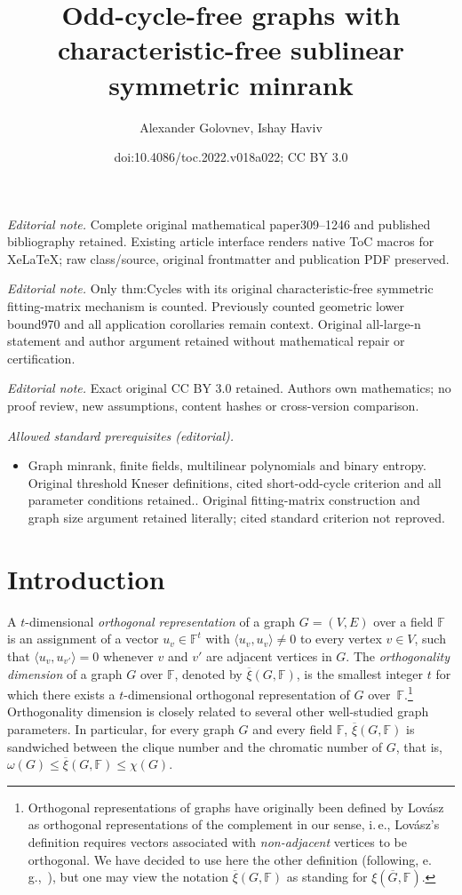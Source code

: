 \documentclass[11pt]{article}
\title{Odd-cycle-free graphs with characteristic-free sublinear symmetric minrank}
\author{Alexander Golovnev, Ishay Haviv}
\date{doi:10.4086/toc.2022.v018a022; CC BY 3.0}
\numberwithin{equation}{section}
\theoremstyle{definition}
\theoremstyle{plain}
\newcommand{\ie}{i.\,e.}
\newcommand{\Fset}{\mathbb{F}}
\newcommand{\od}{\overline{\xi}}
\begin{document}
\maketitle
\noindent\textit{Editorial note.} Complete original mathematical paper309--1246 and published bibliography retained. Existing article interface renders native ToC macros for XeLaTeX; raw class/source, original frontmatter and publication PDF preserved.\par\medskip
\noindent\textit{Editorial note.} Only thm:Cycles with its original characteristic-free symmetric fitting-matrix mechanism is counted. Previously counted geometric lower bound970 and all application corollaries remain context. Original all-large-n statement and author argument retained without mathematical repair or certification.\par\medskip
\noindent\textit{Editorial note.} Exact original CC BY 3.0 retained. Authors own mathematics; no proof review, new assumptions, content hashes or cross-version comparison.\par\medskip
\noindent\textit{Allowed standard prerequisites (editorial).}\begin{itemize}
\item Graph minrank, finite fields, multilinear polynomials and binary entropy. Original threshold Kneser definitions, cited short-odd-cycle criterion and all parameter conditions retained.. Original fitting-matrix construction and graph size argument retained literally; cited standard criterion not reproved.
\end{itemize}\medskip
\section{Introduction}

A $t$-dimensional \emph{orthogonal representation} of a graph $G=(V,E)$ over a field $\Fset$ is an assignment of a vector $u_v \in \Fset^t$ with $\langle u_v,u_v \rangle \neq 0$ to every vertex $v \in V$, such that $\langle u_v, u_{v'} \rangle = 0$ whenever $v$ and $v'$ are adjacent vertices in $G$. The \emph{orthogonality dimension} of a graph $G$ over $\Fset$, denoted by $\od(G, \Fset)$, is the smallest integer $t$ for which there exists a $t$-dimensional orthogonal representation of $G$ over~$\Fset$.\footnote{Orthogonal representations of graphs
%
have originally been defined by Lov\'asz~\cite{Lovasz79}
as orthogonal representations of the complement
in our sense,  %
%
\ie, Lov\'asz's  %
definition requires vectors associated with \emph{non-adjacent} vertices to be orthogonal.
We have decided to use here the other definition (following, e.\,g.,~\cite{deWolfThesis,BrietBLPS15,BrietZ17}), but one may view the notation $\od(G,\Fset)$ as standing for $\xi(\overline{G},\Fset)$.}
%
Orthogonality dimension  %
is closely related to several other well-studied graph parameters. In particular, for every graph $G$ and every field $\Fset$, $\od(G, \Fset)$ is sandwiched between the clique number and the chromatic number of $G$, that is, $\omega(G) \leq \od(G, \Fset) \leq \chi(G)$.
\end{document}
